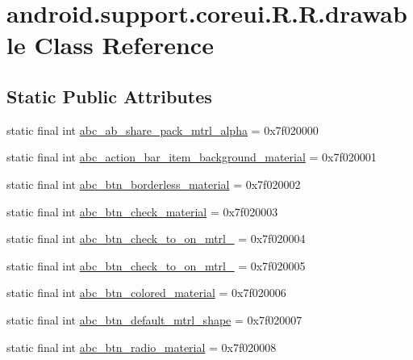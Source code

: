 \hypertarget{classandroid_1_1support_1_1coreui_1_1_r_1_1drawable}{
\section{android.support.coreui.R.R.drawable Class Reference}
\label{classandroid_1_1support_1_1coreui_1_1_r_1_1drawable}
}
\subsection*{Static Public Attributes}
\begin{CompactItemize}
\item 
static final int \hyperlink{classandroid_1_1support_1_1coreui_1_1_r_1_1drawable_1f3bd2786cff7a5c46006568b9b044f8}{abc\_\-ab\_\-share\_\-pack\_\-mtrl\_\-alpha} = 0x7f020000
\item 
static final int \hyperlink{classandroid_1_1support_1_1coreui_1_1_r_1_1drawable_bdd28dec399069e9c4fb0f2e123233d6}{abc\_\-action\_\-bar\_\-item\_\-background\_\-material} = 0x7f020001
\item 
static final int \hyperlink{classandroid_1_1support_1_1coreui_1_1_r_1_1drawable_0cfed5b592cd0049731806248daa564a}{abc\_\-btn\_\-borderless\_\-material} = 0x7f020002
\item 
static final int \hyperlink{classandroid_1_1support_1_1coreui_1_1_r_1_1drawable_94d5c91e66b7558ece509c4b9f5ebb25}{abc\_\-btn\_\-check\_\-material} = 0x7f020003
\item 
static final int \hyperlink{classandroid_1_1support_1_1coreui_1_1_r_1_1drawable_44ea59c8ca42f9a822675f51fae6d1cc}{abc\_\-btn\_\-check\_\-to\_\-on\_\-mtrl\_} = 0x7f020004
\item 
static final int \hyperlink{classandroid_1_1support_1_1coreui_1_1_r_1_1drawable_3f22c83b1dc3b35a81aa92d01a85f827}{abc\_\-btn\_\-check\_\-to\_\-on\_\-mtrl\_} = 0x7f020005
\item 
static final int \hyperlink{classandroid_1_1support_1_1coreui_1_1_r_1_1drawable_18e0304f2bb5d6995e40e8d1213670a2}{abc\_\-btn\_\-colored\_\-material} = 0x7f020006
\item 
static final int \hyperlink{classandroid_1_1support_1_1coreui_1_1_r_1_1drawable_601e73ccd047a654d68c8fce0a4ab3e9}{abc\_\-btn\_\-default\_\-mtrl\_\-shape} = 0x7f020007
\item 
static final int \hyperlink{classandroid_1_1support_1_1coreui_1_1_r_1_1drawable_92052c30c2a15f5598377271ebd204b1}{abc\_\-btn\_\-radio\_\-material} = 0x7f020008

\end{CompactItemize}
